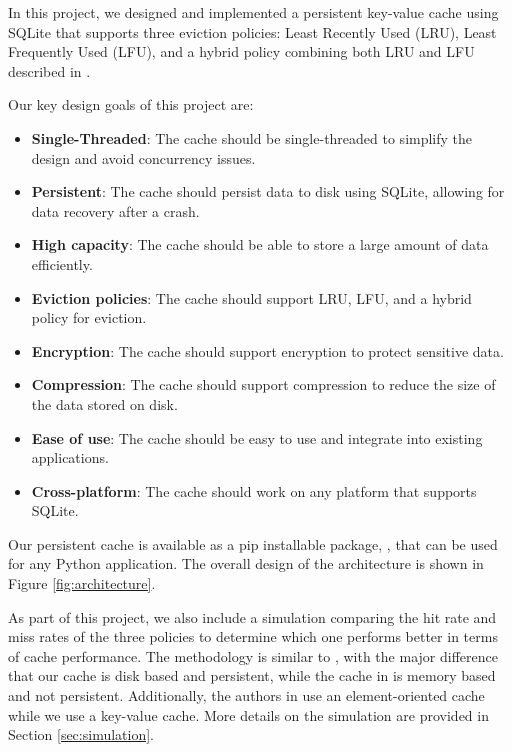 \documentclass[11pt, journal]{IEEEtran}
\begin{document}
In this project, we designed and implemented a
persistent key-value cache using SQLite
that supports three eviction policies: Least Recently Used (LRU),
Least Frequently Used (LFU), and a hybrid policy combining both LRU and LFU
described in \cite{shah2023ImprovedCacheEviction}.


Our key design goals of this project are:
\begin{itemize}
    \item \textbf{Single-Threaded}: The cache should be single-threaded to simplify the design and avoid concurrency issues.
    \item \textbf{Persistent}: The cache should persist data to disk using SQLite, allowing for data recovery after a crash.
    \item \textbf{High capacity}: The cache should be able to store a large amount of data efficiently.
    \item \textbf{Eviction policies}: The cache should support LRU, LFU, and a hybrid policy for eviction.
    \item \textbf{Encryption}: The cache should support encryption to protect sensitive data.
    \item \textbf{Compression}: The cache should support compression to reduce the size of the data stored on disk.
    \item \textbf{Ease of use}: The cache should be easy to use and integrate into existing applications.
    \item \textbf{Cross-platform}: The cache should work on any platform that supports SQLite.
\end{itemize}

Our persistent cache is available as a pip installable package,
\sqlitecache, that
can be used for any Python application.
The overall design of the architecture is shown in Figure \ref{fig:architecture}.

As part of this project, we also include a simulation 
comparing the hit rate
and miss rates of the three policies to determine which one performs better
in terms of cache performance. The methodology is similar to \cite{shah2023ImprovedCacheEviction},
with the major difference that our cache is disk based and persistent,
while the cache in \cite{shah2023ImprovedCacheEviction} is memory based and not persistent.
Additionally, the authors in \cite{shah2023ImprovedCacheEviction} use an element-oriented
cache while we use a key-value cache. More details on the simulation
are provided in Section \ref{sec:simulation}.
\end{document}
